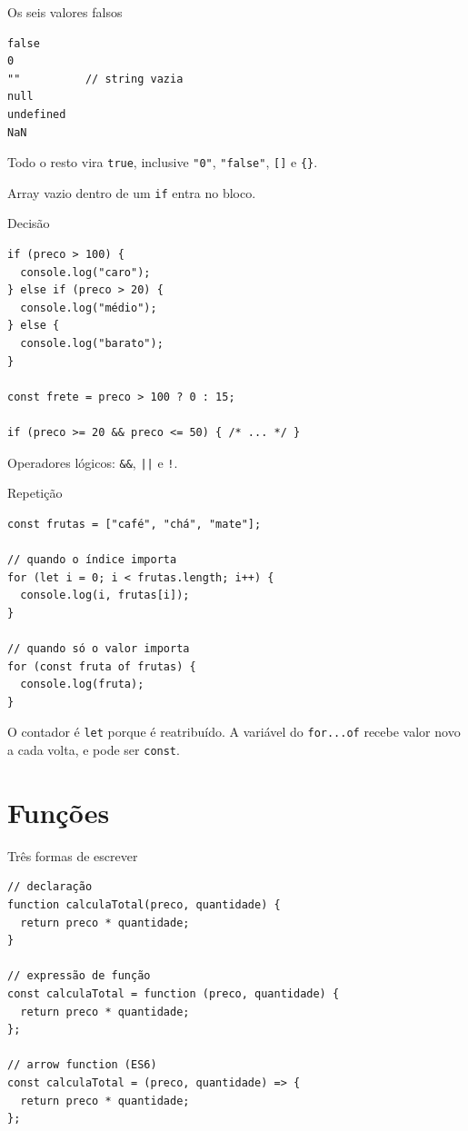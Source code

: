 \documentclass{beamer}
\begin{document}
\begin{frame}[fragile]{Os seis valores falsos}
	\begin{verbatim}
false
0
""          // string vazia
null
undefined
NaN
	\end{verbatim}

	\vspace{0.2cm}
	Todo o resto vira \texttt{true}, inclusive \texttt{"0"}, \texttt{"false"},
	\texttt{[]} e \texttt{\{\}}.

	\vspace{0.2cm}
	Array vazio dentro de um \texttt{if} entra no bloco.
\end{frame}

\begin{frame}[fragile]{Decisão}
	\begin{verbatim}
if (preco > 100) {
  console.log("caro");
} else if (preco > 20) {
  console.log("médio");
} else {
  console.log("barato");
}

const frete = preco > 100 ? 0 : 15;

if (preco >= 20 && preco <= 50) { /* ... */ }
	\end{verbatim}

	\vspace{0.2cm}
	Operadores lógicos: \texttt{\&\&}, \texttt{||} e \texttt{!}.
\end{frame}

\begin{frame}[fragile]{Repetição}
	\begin{verbatim}
const frutas = ["café", "chá", "mate"];

// quando o índice importa
for (let i = 0; i < frutas.length; i++) {
  console.log(i, frutas[i]);
}

// quando só o valor importa
for (const fruta of frutas) {
  console.log(fruta);
}
	\end{verbatim}

	\vspace{0.2cm}
	O contador é \texttt{let} porque é reatribuído. A variável do
	\texttt{for...of} recebe valor novo a cada volta, e pode ser \texttt{const}.
\end{frame}

\section{Funções}

\begin{frame}[fragile]{Três formas de escrever}
	\begin{verbatim}
// declaração
function calculaTotal(preco, quantidade) {
  return preco * quantidade;
}

// expressão de função
const calculaTotal = function (preco, quantidade) {
  return preco * quantidade;
};

// arrow function (ES6)
const calculaTotal = (preco, quantidade) => {
  return preco * quantidade;
};
	\end{verbatim}
\end{frame}
\end{document}
